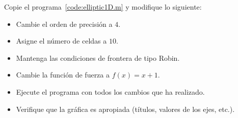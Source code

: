 \begin{problem}
Copie el programa~\ref{code:elliptic1D.m} y modifique lo siguiente:

\begin{itemize}
      \item

            Cambie el orden de precisión a $4$.

      \item

            Asigne el número de celdas a $10$.

      \item

            Mantenga las condiciones de frontera de tipo Robin.

      \item

            Cambie la función de fuerza a $f\left(x\right)=x+1$.

      \item

            Ejecute el programa con todos los cambios que ha
            realizado.

      \item

            Verifique que la gráfica es apropiada (títulos, valores
            de los ejes, etc.).
\end{itemize}
\end{problem}

